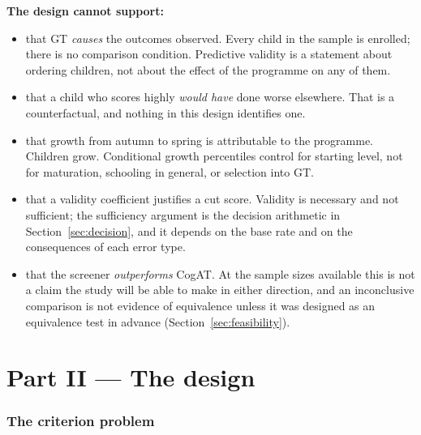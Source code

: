 \documentclass[11pt,a4paper]{article}
\begin{document}
\textbf{The design cannot support:}
\begin{itemize}[leftmargin=1.4em,itemsep=0.15em]
\item that GT \emph{causes} the outcomes observed. Every child in the sample is
enrolled; there is no comparison condition. Predictive validity is a statement
about ordering children, not about the effect of the programme on any of them.
\item that a child who scores highly \emph{would have} done worse elsewhere.
That is a counterfactual, and nothing in this design identifies one.
\item that growth from autumn to spring is attributable to the programme.
Children grow. Conditional growth percentiles control for starting level, not
for maturation, schooling in general, or selection into GT.
\item that a validity coefficient justifies a cut score. Validity is necessary
and not sufficient; the sufficiency argument is the decision arithmetic in
Section~\ref{sec:decision}, and it depends on the base rate and on the
consequences of each error type.
\item that the screener \emph{outperforms} CogAT. At the sample sizes available
this is not a claim the study will be able to make in either direction, and an
inconclusive comparison is not evidence of equivalence unless it was designed as
an equivalence test in advance (Section~\ref{sec:feasibility}).
\end{itemize}


\part*{Part II --- The design}

\section{The criterion problem}
\label{sec:criterion}
\end{document}

